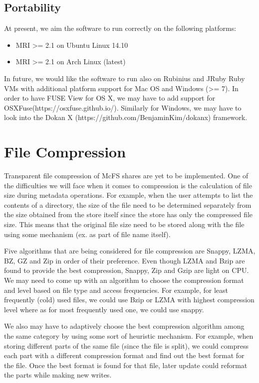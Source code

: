 \subsection{Portability}
At present, we aim the software to run correctly on the following platforms:

\begin{itemize}
	\item MRI \textgreater= 2.1 on Ubuntu Linux 14.10
	\item MRI \textgreater= 2.1 on Arch Linux (latest)
\end{itemize}

In future, we would like the software to run also on Rubinius and JRuby Ruby VMs with additional platform support for Mac OS and Windows (>= 7). In order to have FUSE View for OS X, we may have to add support for OSXFuse(https://osxfuse.github.io/). Similarly for Windows, we may have to look into the Dokan X (https://github.com/BenjaminKim/dokanx) framework.

\section{File Compression}
Transparent file compression of McFS shares are yet to be implemented. One of the difficulties we will face when it comes to compression is the calculation of file size during metadata operations. For example, when the user attempts to list the contents of a directory, the size of the file need to be determined separately from the size obtained from the store itself since the store has only the compressed file size. This means that the original file size need to be stored along with the file using some mechanism (ex. as part of file name itself).

Five algorithms that are being considered for file compression are Snappy, LZMA, BZ, GZ and Zip in order of their preference. Even though LZMA and Bzip are found to provide the best compression, Snappy, Zip and Gzip are light on CPU. We may need to come up with an algorithm to choose the compression format and level based on file type and access frequencies. For example, for least frequently (cold) used files, we could use Bzip or LZMA with highest compression level where as for most frequently used one, we could use snappy.

We also may have to adaptively choose the best compression algorithm among the same category by using some sort of heuristic mechanism. For example, when storing different parts of the same file (since the file is split), we could compress each part with a different compression format and find out the best format for the file. Once the best format is found for that file, later update could reformat the parts while making new writes.

